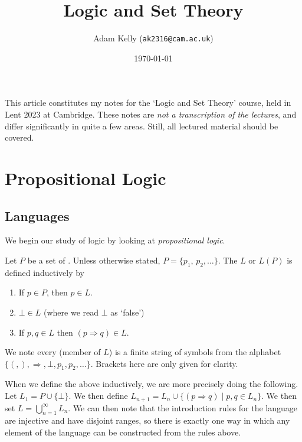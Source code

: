 \documentclass[a4paper]{scrartcl}
\title{Logic and Set Theory}
\author{Adam Kelly (\texttt{ak2316@cam.ac.uk})}
\date{\today}
\begin{document}
\maketitle


This article constitutes my notes for the `Logic and Set Theory' course, held in Lent 2023 at Cambridge. These notes are \emph{not a transcription of the lectures}, and differ significantly in quite a few areas. Still, all lectured material should be covered.



\tableofcontents

\section{Propositional Logic}

\subsection{Languages}

We begin our study of logic by looking at \emph{propositional logic}.

\begin{definition}[Language]
  Let $P$ be a set of . Unless otherwise stated, $P = \{p_1$, $p_2, \dots\}$. The  $L$ or $L(P)$ is defined inductively by
  \begin{enumerate}
    \item If $p \in P$, then $p \in L$.
    \item $\bot \in L$ (where we read $\bot$ as `false')
    \item If $p, q \in L$ then $(p \Rightarrow q) \in L$.
  \end{enumerate}
\end{definition}

We note every  (member of $L$) is a finite string of symbols from the alphabet $\{(,),\Rightarrow, \bot, p_1, p_2, \dots\}$. Brackets here are only given for clarity.

When we define the above inductively, we are more precisely doing the following. Let $L_1 = P \cup \{\bot\}$. We then define $L_{n + 1} = L_n \cup \{(p \Rightarrow q) \mid p, q \in L_n\}$. We then set $L = \bigcup_{n = 1}^{\infty} L_n$. We can then note that the introduction rules for the language are injective and have disjoint ranges, so there is exactly one way in which any element of the language can be constructed from the rules above.
\end{document}
